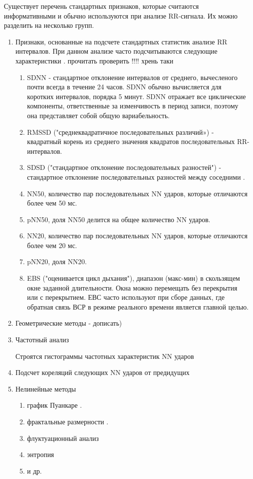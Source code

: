 Существует перечень стандартных признаков, которые считаются информативными и обычно используются при анализе RR-сигнала.
Их можно разделить на несколько групп.

\begin{enumerate}
	\item Признаки, основанные на подсчете стандартных статистик анализе RR интервалов. При данном анализе часто подсчитываются следующие характеристики \cite{pNN, metric_of_hrv}.
	прочитать проверить !!!! хрень таки
	\begin{enumerate}
		\item SDNN - стандартное отклонение интервалов от среднего, вычесленого почти всегда в течение 24 часов. SDNN обычно вычисляется для коротких интервалов, порядка 5 минут. SDNN отражает все циклические компоненты, ответственные за изменчивость в период записи, поэтому она представляет собой общую вариабельность.
		\item 	RMSSD ("среднеквадратичное последовательных различий») - квадратный корень из среднего значения квадратов последовательных RR-интервалов.
		\item SDSD ("стандартное отклонение последовательных разностей") - стандартное отклонение последовательных разностей между соседними .
		\item NN50, количество пар последовательных NN ударов, которые отличаются более чем 50 мс.
		\item pNN50, доля NN50 делится на общее количество NN ударов.
		\item 	NN20, количество пар последовательных NN ударов, которые отличаются более чем 20 мс.
		\item pNN20, доля NN20.
		\item EBS ("оценивается цикл дыхания"), диапазон (макс-мин) в скользящем окне заданной длительности. Окна можно перемещать без перекрытия или с перекрытием. ЕВС часто используют при сборе данных, где обратная связь ВСР в режиме реального времени является главной целью.
	\end{enumerate}
	\item Геометрические методы \cite{geometric_metric} - дописать)
	\item Частотный анализ
	
	Строятся гистограммы частотных характеристик NN ударов
	
	\item Подсчет кореляций следующих NN ударов от предидущих \cite{autocorr_metric}
	\item Нелинейные методы \cite{non_linear_metric}
	
	\begin{enumerate}
		\item график Пуанкаре \cite{poinkare_plot}.
		\item фрактальные размерности \cite{fractal_dim}.
		\item флуктуационный анализ \cite{fluct_analis}
		\item энтропия \cite{entropy1, entropy2, entropy3}
		\item и др. \cite{other_analis1, other_analis2, other_analis3}
	\end{enumerate}	
\end{enumerate}

